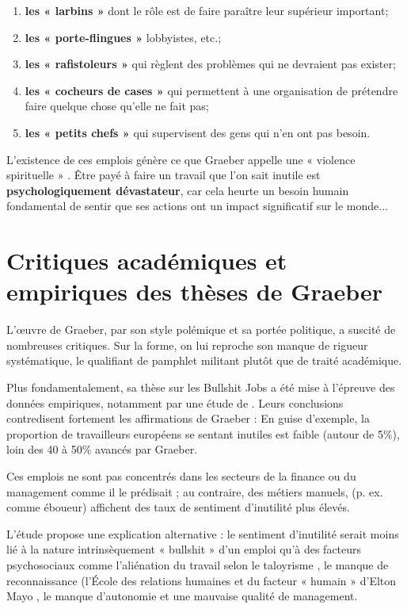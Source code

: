 \begin{enumerate}
    \item \textbf{les « larbins »}  dont le rôle est de faire paraître leur supérieur important;
    \item \textbf{les « porte-flingues  »}  lobbyistes, etc.; 
    \item \textbf{les « rafistoleurs »}  qui règlent des problèmes qui ne devraient pas exister;
    \item \textbf{les « cocheurs de cases »}  qui permettent à une organisation de prétendre faire quelque chose qu'elle ne fait pas;
    \item \textbf{ les « petits chefs »}  qui supervisent des gens qui n'en ont pas besoin.
\end{enumerate}
L'existence de ces emplois génère ce que Graeber appelle une « violence spirituelle » \citet{Graeber2018} . Être payé à faire un travail que l'on sait inutile est \textbf{psychologiquement dévastateur}, car cela heurte un besoin humain fondamental de sentir que ses actions ont un impact significatif sur le monde...

\section{Critiques académiques et empiriques des thèses de Graeber}

L'œuvre de Graeber, par son style polémique et sa portée politique, a suscité de nombreuses critiques. Sur la forme, on lui reproche son manque de rigueur systématique, le qualifiant de pamphlet militant plutôt que de traité académique.

Plus fondamentalement, sa thèse sur les Bullshit Jobs a été mise à l'épreuve des données empiriques, notamment par une étude de \citep{Soffia2022Alienation}. Leurs conclusions contredisent fortement les affirmations de Graeber :
En guise d'exemple, la proportion de travailleurs européens se sentant inutiles est faible (autour de 5\%), loin des 40 à 50\% avancés par Graeber.

Ces emplois ne sont pas concentrés dans les secteurs de la finance ou du management comme il le prédisait ; au contraire, des métiers manuels, (p. ex. comme éboueur) affichent des taux de sentiment d'inutilité plus élevés.

L'étude propose une explication alternative : le sentiment d'inutilité serait moins lié à la nature intrinsèquement « bullshit »  d'un emploi qu'à des facteurs psychosociaux comme l'aliénation du travail selon le taloyrisme \citep{Taylor1993The} , le manque de reconnaissance (l'École des relations humaines et du facteur « humain » d'Elton Mayo \citep{Mayo1934The} , le manque d'autonomie et une mauvaise qualité de management.

